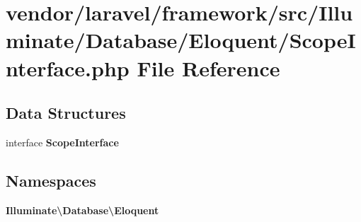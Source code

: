 \section{vendor/laravel/framework/src/\+Illuminate/\+Database/\+Eloquent/\+Scope\+Interface.php File Reference}
\label{_scope_interface_8php}
\subsection*{Data Structures}
\begin{DoxyCompactItemize}
\item 
interface {\bf Scope\+Interface}
\end{DoxyCompactItemize}
\subsection*{Namespaces}
\begin{DoxyCompactItemize}
\item 
 {\bf Illuminate\textbackslash{}\+Database\textbackslash{}\+Eloquent}
\end{DoxyCompactItemize}
